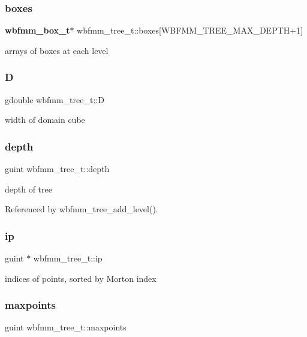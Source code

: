 \subsubsection{boxes}
{\footnotesize\ttfamily \textbf{ wbfmm\+\_\+box\+\_\+t}$\ast$ wbfmm\+\_\+tree\+\_\+t\+::boxes[W\+B\+F\+M\+M\+\_\+\+T\+R\+E\+E\+\_\+\+M\+A\+X\+\_\+\+D\+E\+P\+TH+1]}

arrays of boxes at each level \mbox{\label{structwbfmm__tree__t_a3f8ee26d3fe9c69bb5ba7583711c2175}} 
\subsubsection{D}
{\footnotesize\ttfamily gdouble wbfmm\+\_\+tree\+\_\+t\+::D}

width of domain cube \mbox{\label{structwbfmm__tree__t_ad6a069db29489d75083169ca0bca9901}} 
\subsubsection{depth}
{\footnotesize\ttfamily guint wbfmm\+\_\+tree\+\_\+t\+::depth}

depth of tree 

Referenced by wbfmm\+\_\+tree\+\_\+add\+\_\+level().

\mbox{\label{structwbfmm__tree__t_ad1b0ef45823888a234d18840d655f8e0}} 
\subsubsection{ip}
{\footnotesize\ttfamily guint $\ast$ wbfmm\+\_\+tree\+\_\+t\+::ip}

indices of points, sorted by Morton index \mbox{\label{structwbfmm__tree__t_a81074e586538485590e38b9bc9274326}} 
\subsubsection{maxpoints}
{\footnotesize\ttfamily guint wbfmm\+\_\+tree\+\_\+t\+::maxpoints}

